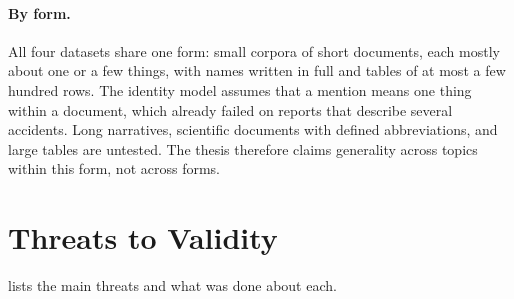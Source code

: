 \paragraph{By form.} All four datasets share one form: small corpora of short documents, each mostly about one or a
few things, with names written in full and tables of at most a few hundred rows. The identity model assumes that a
mention means one thing within a document, which already failed on reports that describe several accidents. Long
narratives, scientific documents with defined abbreviations, and large tables are untested. The thesis therefore
claims generality across topics within this form, not across forms.

\section{Threats to Validity}\label{sec:ch08-threats-to-validity}

 lists the main threats and what was done about each.

